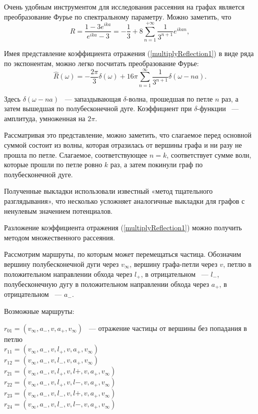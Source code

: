 \documentclass[a4 paper, 12 pt]{extarticle}
\begin{document}
   Очень удобным инструментом для исследования рассеяния на графах является преобразование Фурье по спектральному параметру.
   Можно заметить, что \[  R = \frac{1-3e^{ika}}{e^{ika}-3} = -\frac{1}{3} + 8 \sum_{n=1}^{+\infty}\frac{1}{3^{n+1}}e^{ikan},\]
   
   Имея представление коэффициента отражения (\ref{multiplyReflection1}) в виде ряда по экспонентам, можно легко посчитать преобразование Фурье:
   \[\widehat{R}(\omega)=-\frac{2\pi}{3}\delta(\omega)+16\pi\sum_{n=1}^{\infty}\frac{1}{3^{n+1}}\delta(\omega-na).\]
   
   Здесь $\delta\left(\omega -na\right)$ ~--- запаздывающая $\delta$-волна, прошедшая по петле $n$ раз, а затем вышедшая по полубесконечной дуге. Коэффициент при $\delta$-функции ~--- амплитуда, умноженная на $2\pi$.
   
   Рассматривая это представление, можно заметить, что слагаемое перед основной суммой состоит из волны, которая отразилась от вершины графа и ни разу не прошла по петле. Слагаемое, соответствующее $n=k$, соответствует сумме волн, которые прошли по петле ровно $k$ раз, а затем покинули граф по полубесконечной дуге.
   
   Полученные выкладки использовали известный «метод тщательного разглядывания», что несколько усложняет аналогичные выкладки для графов с ненулевым значением потенциалов.
   
   Разложение коэффициента отражения (\ref{multiplyReflection1}) можно получить методом множественного рассеяния.
   
   Рассмотрим маршруты, по которым может перемещаться частица. Обозначим вершину полубесконечной дуги через $v_\infty$, вершину графа-петли через $v$, петлю в положительном направлении обхода через $l_+$, в отрицательном ~--- $l_-$, полубесконечную дугу в положительном направлении обхода через $a_+$, в отрицательном ~--- $a_-$.
   
   Возможные маршруты:

   \begin{table}[!htb]
   	$r_{01} = \left(v_\infty,a_-,v,a_+,v_\infty\right)$ ~--- отражение частицы от вершины без попадания в петлю \\
   	$r_{11} = \left(v_\infty,a_-,v,l_+,v,a_+,v_\infty\right)$ \\
   	$r_{12} = \left(v_\infty,a_-,v,l_-,v,a_+,v_\infty\right)$ \\
   	$r_{21} = \left(v_\infty,a_-,v,l_+,v,l+,v,a_+,v_\infty\right)$ \\
   	$r_{22} = \left(v_\infty,a_-,v,l_+,v,l-,v,a_+,v_\infty\right)$   \\
   	$r_{23} = \left(v_\infty,a_-,v,l_-,v,l+,v,a_+,v_\infty\right)$ \\
   	$r_{24} = \left(v_\infty,a_-,v,l_-,v,l-,v,a_+,v_\infty\right)$ \\
   \end{table}
\end{document}
